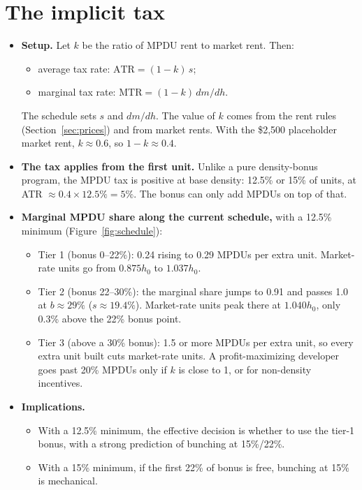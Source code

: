 \documentclass[11pt]{article}
\begin{document}
\section{The implicit tax}
\begin{itemize}
  \item \textbf{Setup.} Let $k$ be the ratio of MPDU rent to market rent. Then:
    \begin{itemize}
      \item average tax rate: $\text{ATR}=(1-k)\,s$;
      \item marginal tax rate: $\text{MTR}=(1-k)\,dm/dh$.
    \end{itemize}
    The schedule sets $s$ and $dm/dh$. The value of $k$ comes from the rent rules (Section~\ref{sec:prices}) and from market rents. With the \$2,500 placeholder market rent, $k\approx0.6$, so $1-k\approx0.4$.
  \item \textbf{The tax applies from the first unit.} Unlike a pure density-bonus program, the MPDU tax is positive at base density: 12.5\% or 15\% of units, at ATR $\approx0.4\times12.5\%=5\%$. The bonus can only add MPDUs on top of that.
  \item \textbf{Marginal MPDU share along the current schedule,} with a 12.5\% minimum (Figure~\ref{fig:schedule}):
    \begin{itemize}
      \item Tier 1 (bonus 0--22\%): 0.24 rising to 0.29 MPDUs per extra unit. Market-rate units go from $0.875h_0$ to $1.037h_0$.
      \item Tier 2 (bonus 22--30\%): the marginal share jumps to 0.91 and passes 1.0 at $b\approx29\%$ ($s\approx19.4\%$). Market-rate units peak there at $1.040h_0$, only 0.3\% above the 22\% bonus point.
      \item Tier 3 (above a 30\% bonus): 1.5 or more MPDUs per extra unit, so every extra unit built cuts market-rate units. A profit-maximizing developer goes past 20\% MPDUs only if $k$ is close to 1, or for non-density incentives.
    \end{itemize}
  \item \textbf{Implications.}
    \begin{itemize}
      \item With a 12.5\% minimum, the effective decision is whether to use the tier-1 bonus, with a strong prediction of bunching at 15\%/22\%.
      \item With a 15\% minimum, if the first 22\% of bonus is free, bunching at 15\% is mechanical.

\end{itemize}
\end{itemize}
\end{document}
